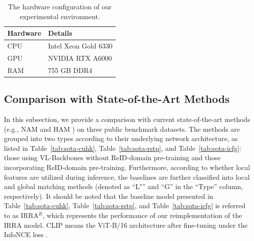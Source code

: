 \documentclass[acmsmall]{acmart}
\begin{document}
\begin{table}[t] \footnotesize
    \centering
    \caption{The hardware configuration of our experimental environment.}
    \begin{tabular}{ll}
    \toprule
    Hardware & Details \\
    \midrule
    CPU & Intel Xeon Gold 6330 \\
    GPU & NVIDIA RTX A6000 \\
    RAM & 755 GB DDR4 \\
    \bottomrule
    \end{tabular}
    \label{tab:hardware}
\end{table}

\subsection{Comparison with State-of-the-Art Methods}

In this subsection, we provide a comparison with current
state-of-the-art methods (e.g., NAM \cite{tan2024harnessing} and HAM
\cite{jiang2025modeling}) on three public benchmark datasets. The
methods are grouped into two types according to their underlying
network architecture, as listed in Table~\ref{tab:sota-cuhk},
Table~\ref{tab:sota-rstp}, and Table~\ref{tab:sota-icfg}: those
using VL-Backbones without ReID-domain pre-training and those
incorporating ReID-domain pre-training. Furthermore, according to
whether local features are utilized during inference, the baselines
are further classified into local and global matching methods
(denoted as ``L"'' and ``G'' in the ``Type'' column, respectively).
It should be noted that the baseline model presented in
Table~\ref{tab:sota-cuhk}, Table~\ref{tab:sota-rstp}, and
Table~\ref{tab:sota-icfg} is referred to as IRRA$^R$, which
represents the performance of our reimplementation of the IRRA
model. CLIP means the ViT-B/16 architecture after fine-tuning under
the InfoNCE loss \cite{oord2018representation}.
\end{document}
